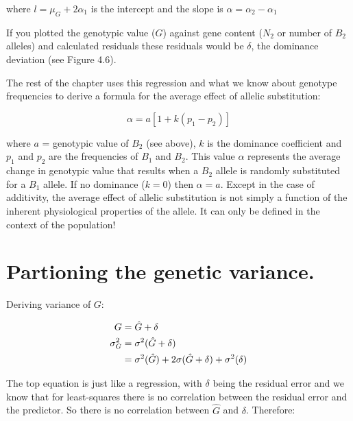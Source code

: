 \documentclass[
]{book}
\begin{document}
where \(l = \mu_G + 2\alpha_1\) is the intercept and the slope is \(\alpha = \alpha_2 - \alpha_1\)

If you plotted the genotypic value (\(G\)) against gene content (\(N_2\) or number of \(B_2\) alleles) and calculated residuals these residuals would be \(\delta\), the dominance deviation (see Figure 4.6).

The rest of the chapter uses this regression and what we know about genotype frequencies to derive a formula for the average effect of allelic substitution:

\begin{equation}
  \alpha = a[1 + k(p_1 - p_2)]
  \label{eq:allelic-sub-effect}
\end{equation}

where \(a\) = genotypic value of \(B_2\) (see above), \(k\) is the dominance coefficient and \(p_1\) and \(p_2\) are the frequencies of \(B_1\) and \(B_2\). This value \(\alpha\) represents the average change in genotypic value that results when a \(B_2\) allele is randomly substituted for a \(B_1\) allele. If no dominance (\(k = 0\)) then \(\alpha = a\). Except in the case of additivity, the average effect of allelic substitution is not simply a function of the inherent physiological properties of the allele. It can only be defined in the context of the population!

\hypertarget{partioning-the-genetic-variance.}{%
\section{Partioning the genetic variance.}\label{partioning-the-genetic-variance.}}

Deriving variance of \(G\):

\begin{align}
\begin{split}
  G &= \hat{G} + \delta \notag \\
  \sigma^2_G &= \sigma^2(\hat{G} + \delta) \notag \\
  &= \sigma^2(\hat{G}) + 2\sigma(\hat{G} + \delta) + \sigma^2(\delta)
\end{split}
\label{eq:total-genetic-variance-longwinded}
\end{align}

The top equation is just like a regression, with \(\delta\) being the residual error and we know that for least-squares there is no correlation between the residual error and the predictor. So there is no correlation between \(\hat{G}\) and \(\delta\). Therefore:
\end{document}

